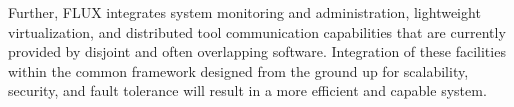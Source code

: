 Further, FLUX integrates system monitoring and
administration, lightweight virtualization, 
and distributed tool communication capabilities 
that are currently provided by disjoint
and often overlapping software. 
Integration of these facilities within the common framework
designed from the ground up for scalability, security,
and fault tolerance will result in a more efficient
and capable system.

\ifcomments
{}

\ifcomments
{}

\ifcomments
{}

\ifcomments
{}


